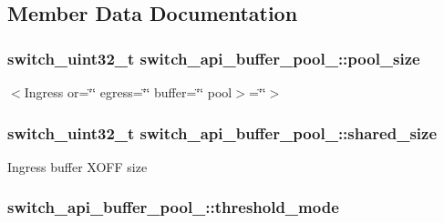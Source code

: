 \subsection{Member Data Documentation}
\hypertarget{structswitch__api__buffer__pool___ae06e61aaeb2d5f1c05fb0acc64a27f4f}{
\subsubsection[{pool\+\_\+size}]{\setlength{\rightskip}{0pt plus 5cm}switch\+\_\+uint32\+\_\+t switch\+\_\+api\+\_\+buffer\+\_\+pool\+\_\+\+::pool\+\_\+size}}\label{structswitch__api__buffer__pool___ae06e61aaeb2d5f1c05fb0acc64a27f4f}
$<$\+Ingress or=\char`\"{}\char`\"{} egress=\char`\"{}\char`\"{} buffer=\char`\"{}\char`\"{} pool$>$=\char`\"{}\char`\"{}$>$ \hypertarget{structswitch__api__buffer__pool___a9924befb05683e0ca6252a1c697ccdc5}{
\subsubsection[{shared\+\_\+size}]{\setlength{\rightskip}{0pt plus 5cm}switch\+\_\+uint32\+\_\+t switch\+\_\+api\+\_\+buffer\+\_\+pool\+\_\+\+::shared\+\_\+size}}\label{structswitch__api__buffer__pool___a9924befb05683e0ca6252a1c697ccdc5}
Ingress buffer X\+O\+F\+F size \hypertarget{structswitch__api__buffer__pool___ab4c0e9477a2c07acbfad5a134020dce7}{
\subsubsection[{threshold\+\_\+mode}]{ switch\+\_\+api\+\_\+buffer\+\_\+pool\+\_\+\+::threshold\+\_\+mode}}\label{structswitch__api__buffer__pool___ab4c0e9477a2c07acbfad5a134020dce7}
